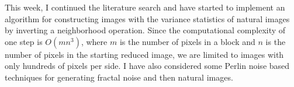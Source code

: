\documentclass[../notebook.tex]{subfiles}
\begin{document}
\label{sec:sum7}

This week, I continued the literature search and have started to implement an
algorithm for constructing images with the variance statistics of natural images
by inverting a neighborhood operation. Since the computational complexity of one
step is $O(mn^3)$, where $m$ is the number of pixels in a block and $n$ is the
number of pixels in the starting reduced image, we are limited to images with
only hundreds of pixels per side. I have also considered some Perlin noise based
techniques for generating fractal noise and then natural images.
\end{document}
